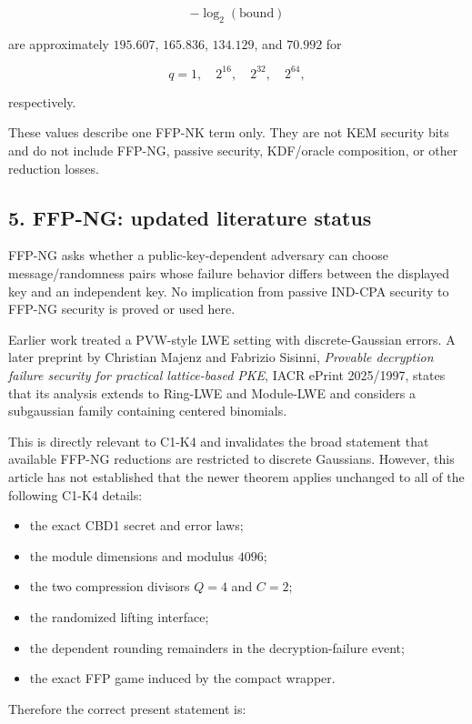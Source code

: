 \documentclass[11pt,a4paper]{article}
\providecommand{\tightlist}{\setlength{\itemsep}{0pt}\setlength{\parskip}{0pt}}
\begin{document}
\[
-\log_2(\text{bound})
\]

are approximately \(195.607\), \(165.836\), \(134.129\), and \(70.992\) for

\[
q=1,\quad2^{16},\quad2^{32},\quad2^{64},
\]

respectively.

These values describe one FFP-NK term only. They are not KEM security bits and do not include FFP-NG, passive security, KDF/oracle composition, or other reduction losses.

\subsection{5. FFP-NG: updated literature status}\label{ffp-ng-updated-literature-status}

FFP-NG asks whether a public-key-dependent adversary can choose message/randomness pairs whose failure behavior differs between the displayed key and an independent key. No implication from passive IND-CPA security to FFP-NG security is proved or used here.

Earlier work treated a PVW-style LWE setting with discrete-Gaussian errors. A later preprint by Christian Majenz and Fabrizio Sisinni, \emph{Provable decryption failure security for practical lattice-based PKE}, IACR ePrint 2025/1997, states that its analysis extends to Ring-LWE and Module-LWE and considers a subgaussian family containing centered binomials.

This is directly relevant to C1-K4 and invalidates the broad statement that available FFP-NG reductions are restricted to discrete Gaussians. However, this article has not established that the newer theorem applies unchanged to all of the following C1-K4 details:

\begin{itemize}
\tightlist
\item
  the exact CBD1 secret and error laws;
\item
  the module dimensions and modulus \(4096\);
\item
  the two compression divisors \(Q=4\) and \(C=2\);
\item
  the randomized lifting interface;
\item
  the dependent rounding remainders in the decryption-failure event;
\item
  the exact FFP game induced by the compact wrapper.
\end{itemize}

Therefore the correct present statement is:
\end{document}
